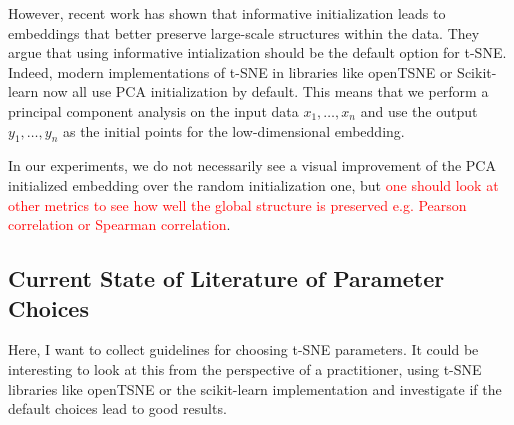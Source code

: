 However, recent work \cite{kobak21} has shown that informative initialization leads to embeddings that better preserve large-scale structures within the data. 
They argue that using informative intialization should be the default option for t-SNE.
Indeed, modern implementations of t-SNE in libraries like openTSNE \cite{openTSNE} or Scikit-learn now all use PCA initialization by default. 
This means that we perform a principal component analysis on the input data $x_1, \dots, x_n$ and use the output $y_1, \dots, y_n$ as the initial points for the low-dimensional embedding. 

In our experiments, we do not necessarily see a visual improvement of the PCA initialized embedding over the random initialization one, but \textcolor{red}{one should look at other metrics to see how well the global structure is preserved e.g. Pearson correlation or Spearman correlation}. 

\subsection{Current State of Literature of Parameter Choices}
Here, I want to collect guidelines for choosing t-SNE parameters. It could be interesting to look at this from the perspective of a practitioner, using t-SNE libraries like openTSNE or the scikit-learn implementation and investigate if the default choices lead to good results. 

